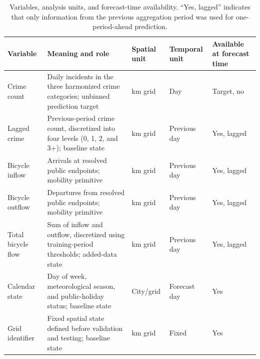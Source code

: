 \begin{table}[!htbp]
\caption{Variables, analysis units, and forecast-time availability. ``Yes,
lagged'' indicates that only information from the previous aggregation
period was used for one-period-ahead prediction.}
\label{tab:variable_availability}
\centering
\begin{tabularx}{\textwidth}{
>{\RaggedRight\arraybackslash}p{2.1cm}
>{\RaggedRight\arraybackslash}X
>{\RaggedRight\arraybackslash}p{1.7cm}
>{\RaggedRight\arraybackslash}p{1.8cm}
>{\RaggedRight\arraybackslash}p{2.0cm}}
\toprule
\textbf{Variable} & \textbf{Meaning and role} & \textbf{Spatial unit} &
\textbf{Temporal unit} & \textbf{Available at forecast time}\\
\midrule
Crime count & Daily incidents in the three harmonized crime categories;
unbinned prediction target & 1 km grid & Day & Target, no\\
Lagged crime & Previous-period crime count, discretized into four levels
(0, 1, 2, and 3+); baseline state & 1 km grid & Previous day & Yes, lagged\\
Bicycle inflow & Arrivals at resolved public endpoints; mobility primitive &
1 km grid & Previous day & Yes, lagged\\
Bicycle outflow & Departures from resolved public endpoints; mobility
primitive & 1 km grid & Previous day & Yes, lagged\\
Total bicycle flow & Sum of inflow and outflow, discretized using
training-period thresholds; added-data state & 1 km grid & Previous day &
Yes, lagged\\
Calendar state & Day of week, meteorological season, and public-holiday
status; baseline state & City/grid & Forecast day & Yes\\
Grid identifier & Fixed spatial state defined before validation and testing;
baseline state & 1 km grid & Fixed & Yes\\
\bottomrule
\end{tabularx}
\end{table}
